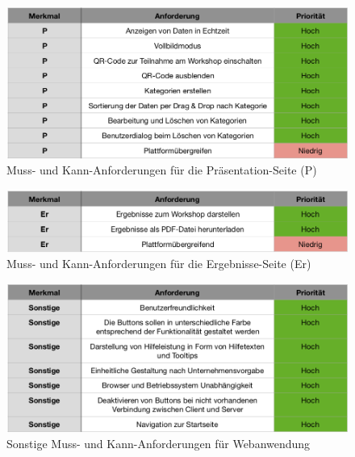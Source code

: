 \begin{figure}[H]
  \centering  
  \includegraphics[scale=0.6]{img/Presentation-Seite.png}
  \caption{Muss- und Kann-Anforderungen für die Präsentation-Seite (P)}	
  \label{fig:presentation-seite}
\end{figure}

\begin{figure}[H]
  \centering  
  \includegraphics[scale=0.6]{img/Ergebnisse-Seite.png}
  \caption{Muss- und Kann-Anforderungen für die Ergebnisse-Seite (Er)}
  \label{fig:ergebnisse-seite}
\end{figure}

\begin{figure}[H]
  \centering  
  \includegraphics[scale=0.6]{img/Sonstige.png}
  \caption{Sonstige Muss- und Kann-Anforderungen für Webanwendung} 	
  \label{fig:sonstige}
\end{figure}

